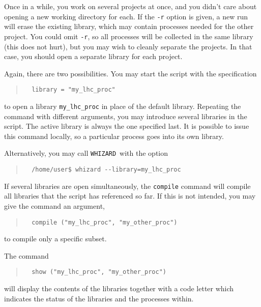 \documentclass[12pt]{book}
\newcommand{\ttt}[1]{\texttt{#1}}
\newcommand{\whizard}{\texttt{WHIZARD}}
\begin{document}
Once in a while, you work on several projects at once, and you didn't care
about opening a new working directory for each.  If the \verb|-r| option is
given, a new run will erase the existing library, which may contain processes
needed for the other project.  You could omit \verb|-r|, so all processes will
be collected in the same library (this does not hurt), but you may wish to
cleanly separate the projects.  In that case, you should open a separate
library for each project.

Again, there are two possibilities.  You may start the script with the
specification
\begin{quote}
\begin{footnotesize}
\begin{verbatim}
  library = "my_lhc_proc"  
\end{verbatim}
\end{footnotesize}
\end{quote}
to open a library \verb|my_lhc_proc| in place of the default library.
Repeating the command with different arguments, you may introduce several
libraries in the script.  The active library is always the one specified
last.  It is possible to issue this command locally, so a particular process
goes into its own library.

Alternatively, you may call \whizard\ with the option
\begin{quote}
\begin{footnotesize}
\begin{verbatim}
  /home/user$ whizard --library=my_lhc_proc  
\end{verbatim}
\end{footnotesize}
\end{quote}

If several libraries are open simultaneously, the \ttt{compile} command will
compile all libraries that the script has referenced so far.  If this is not
intended, you may give the command an argument,
\begin{quote}
\begin{footnotesize}
\begin{verbatim}
  compile ("my_lhc_proc", "my_other_proc")
\end{verbatim}
\end{footnotesize}
\end{quote}
to compile only a specific subset.

The command
\begin{quote}
\begin{footnotesize}
\begin{verbatim}
  show ("my_lhc_proc", "my_other_proc")
\end{verbatim}
\end{footnotesize}
\end{quote}
will display the contents of the libraries together with a code letter which
indicates the status of the libraries and the processes within.
\end{document}
